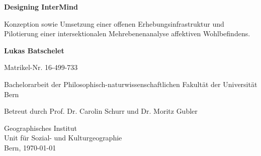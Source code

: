 \documentclass{template}
\begin{document}

\begin{titlepage}
\sffamily
\raggedright

\vspace*{1cm}
\huge
\textbf{Designing InterMind}

\vspace{0.5cm}
\large
Konzeption sowie Umsetzung einer offenen Erhebungsinfrastruktur und Pilotierung einer intersektionalen Mehrebenenanalyse affektiven Wohlbefindens.

\vspace{1.5cm}
\textbf{Lukas Batschelet}

\vspace{0.5cm}
Matrikel-Nr. 16-499-733

\vfill
\normalsize
Bachelorarbeit der Philosophisch-naturwissenschaftlichen Fakultät der Universität Bern

\vspace{0.8cm}
Betreut durch Prof. Dr. Carolin Schurr und Dr. Moritz Gubler


Geographisches Institut \\
Unit für Sozial- und Kulturgeographie\\
Bern, \today

\end{titlepage}



\clearpage

\begin{abstract}

\end{abstract}



\clearpage


\begingroup
  \let\clearpage\relax
  \let\cleardoublepage\relax
  \setlength{\parskip}{0pt}
  \setlength{\itemsep}{0pt plus 0.15pt}
  \tableofcontents
\endgroup



\begingroup
  \let\clearpage\relax
  \let\cleardoublepage\relax
  \printglossary[
    type=\acronymtype,
    title=Abkürzungsverzeichnis,
    toctitle=Abkürzungsverzeichnis,
    nonumberlist,
    nogroupskip
  ]
\endgroup
\end{document}
